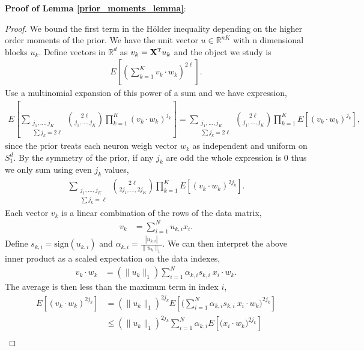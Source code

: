 \documentclass{article}
\numberwithin{equation}{section}
\theoremstyle{Lemma}
\theoremstyle{Corollary}
\theoremstyle{Theorem}
\theoremstyle{Remark}
\begin{document}
\textbf{Proof of Lemma \ref{prior_moments_lemma}}:
\begin{proof}
We bound the first term in the H{\"o}lder inequality depending on the higher order moments of the prior. We have the unit vector $u \in \mathbb{R}^{nK}$ with n dimensional blocks $u_{k}$. Define vectors in $\mathbb{R}^{d}$ as $v_{k} = \textbf{X}^{\text{\tiny{T}}}u_{k}$ and the object we study is
\begin{align}
    E[(\sum_{k=1}^{K}v_{k} \cdot w_{k})^{2\ell}].
\end{align}
Use a multinomial expansion of this power of a sum and we have expression,
\begin{align}
    E[\sum_{\substack{j_{1}, \ldots, j_{K}\\ \sum j_{k} = 2\ell}}\binom{2\ell}{j_{1},\ldots, j_{K}}\prod_{k=1}^{K}(v_{k}\cdot w_{k})^{j_{k}}]=\sum_{\substack{j_{1}, \ldots, j_{K}\\ \sum j_{k} = 2\ell}}\binom{2\ell}{j_{1},\ldots, j_{K}}\prod_{k=1}^{K}E[(v_{k}\cdot w_{k})^{j_{k}}],
\end{align}
since the prior treats each neuron weigh vector $w_{k}$ as independent and uniform on $S^{d}_{1}$. By the symmetry of the prior, if any $j_{k}$ are odd the whole expression is 0 thus we only sum using even $j_{k}$ values,
\begin{align}
    \sum_{\substack{j_{1}, \ldots, j_{K} \\ \sum j_{k} = \ell}}\binom{2
    \ell}{2j_{1},\ldots, 2j_{K}}\prod_{k=1}^{K}E[(v_{k}\cdot w_{k})^{2j_{k}}]. \label{multi_neuron_sum}
\end{align}
Each vector $v_{k}$ is a linear combination of the rows of the data matrix,
\begin{align}
    v_{k}&= \sum_{i=1}^{N}u_{k,i}x_{i}.
\end{align}
Define $s_{k,i} = \text{sign}(u_{k,i})$ and $\alpha_{k,i} = \frac{|u_{k,i}|}{\|u_{k}\|_{1}}$. We can then interpret the above inner product as a scaled expectation on the data indexes,
\begin{align}
    v_{k} \cdot w_{k}&= (\|u_{k}\|_{1})\sum_{i=1}^{N} \alpha_{k,i} s_{k,i} ~x_{i} \cdot w_{k}.
\end{align}
The average is then less than the maximum term in index $i$,
\begin{align}
    E[(v_{k}\cdot w_{k})^{2j_{k}}]&=(\|u_{k}\|_{1})^{2j_{k}}E[\Big(\sum_{i=1}^{N} \alpha_{k,i} s_{k,i}~x_{i} \cdot w_{k}\Big)^{2j_{k}}]\\
     &\leq (\|u_{k}\|_{1})^{2j_{k}}\sum_{i=1}^{N} \alpha_{k,i}E[\Big(x_{i} \cdot w_{k} \Big)^{2j_{k}}]\\

\end{align}
\end{proof}
\end{document}
